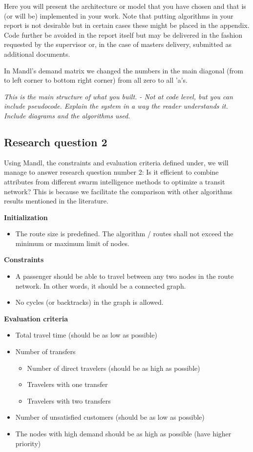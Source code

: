Here you will present the architecture or model that you have chosen and that is (or will be) implemented in your work. Note that putting algorithms in your report is not desirable but in certain cases these might be placed in the appendix. Code further be avoided in the report itself but may be delivered in the fashion requested by the supervisor or, in the case of masters delivery, submitted as additional documents. 

In Mandl's demand matrix we changed the numbers in the main diagonal (from to left corner to bottom right corner) from all zero to all 'a's. 

\textit{This is the main structure of what you built.
- Not at code level, but you can include pseudocode.
Explain the system in a way the reader understands it.
Include diagrams and the algorithms used.}

\subsection{Research question 2}
Using Mandl, the constraints and evaluation criteria defined under, we will manage to answer research question number 2: Is it efficient to combine attributes from different swarm intelligence methods to optimize a transit network? This is because we facilitate the comparison with other algorithms results mentioned in the literature. 

\textbf{Initialization}
\begin{itemize}
\item The route size is predefined. The algorithm / routes shall not exceed the minimum or maximum limit of nodes.
\end{itemize}

\textbf{Constraints}
\begin{itemize}
\item A passenger should be able to travel between any two nodes in the route network. In other words, it should be a connected graph. 
\item No cycles (or backtracks) in the graph is allowed.

\end{itemize}

\textbf{Evaluation criteria}
\begin{itemize}
\item Total travel time (should be as low as possible)
\item Number of transfers
\begin{itemize}
\item Number of direct travelers (should be as high as possible)
\item Travelers with one transfer
\item Travelers with two transfers
\end{itemize}
\item Number of unsatisfied customers (should be as low as possible)
\item The nodes with high demand should be as high as possible (have higher priority)
\end{itemize}


